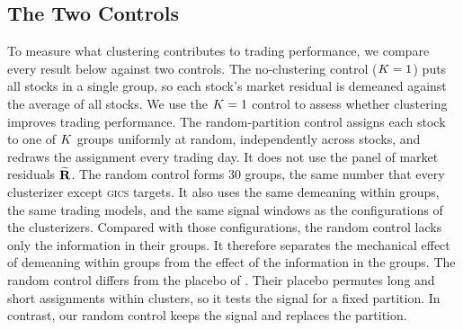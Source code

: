
\subsection{The Two Controls}
\label{sec:controls}

To measure what clustering contributes to trading performance, we compare every result below against two controls. The no-clustering control ($K = 1$) puts all stocks in a single group, so each stock's market residual is demeaned against the average of all stocks. We use the $K = 1$ control to assess whether clustering improves trading performance. The random-partition control assigns each stock to one of $K$ groups uniformly at
random, independently across stocks, and redraws the assignment every trading day.
It does not use the panel of market residuals
$\widetilde{\mathbf{R}}$. The random control forms 30 groups, the same number that every clusterizer except \textsc{gics} targets. It also uses the same demeaning within groups, the same trading models, and the same signal windows as the configurations of the clusterizers. Compared with those configurations, the random control lacks only the information in their groups. It therefore separates the mechanical effect of demeaning within groups from the effect of the information in the groups. The random control differs from the placebo of \citet{brutti2026orthogonal}. Their placebo permutes long and short assignments within clusters, so it tests the signal for a fixed partition. In contrast, our random control keeps the signal and replaces the partition.



